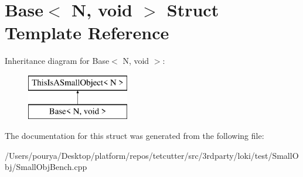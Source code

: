 \hypertarget{structBase_3_01N_00_01void_01_4}{}\section{Base$<$ N, void $>$ Struct Template Reference}
\label{structBase_3_01N_00_01void_01_4}
Inheritance diagram for Base$<$ N, void $>$\+:\begin{figure}[H]
\begin{center}
\leavevmode
\includegraphics[height=2.000000cm]{structBase_3_01N_00_01void_01_4}
\end{center}
\end{figure}


The documentation for this struct was generated from the following file\+:\begin{DoxyCompactItemize}
\item 
/\+Users/pourya/\+Desktop/platform/repos/tetcutter/src/3rdparty/loki/test/\+Small\+Obj/Small\+Obj\+Bench.\+cpp\end{DoxyCompactItemize}
